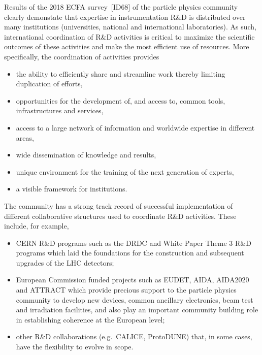 Results of the 2018 ECFA survey~[ID68] of the particle physics community clearly demonstate that expertise in instrumentation R\&D is distributed over many institutions (universities, national and international laboratories).  As such, international coordination of R\&D activities is critical to maximize the scientific outcomes of these activities and make the most efficient use of resources. More specifically, the coordination of activities provides
\begin{itemize}
\item the ability to efficiently share and streamline work thereby limiting duplication of efforts,
\item opportunities for the development of, and access to, common tools, infrastructures and services,
\item access to a large network of information and worldwide expertise in different areas,
\item wide dissemination of knowledge and results,
\item unique environment for the training of the next generation of experts,
\item a visible framework for institutions.
\end{itemize}

The community has a strong track record of successful implementation of different collaborative structures used to coordinate R\&D activities.  These include, for example,
\begin{itemize}
\item CERN R\&D programs such as the DRDC and White Paper Theme 3 R\&D programs which laid the foundations for the construction and subsequent upgrades of the LHC detectors;
\item European Commission funded projects such as EUDET, AIDA, AIDA2020 and ATTRACT which provide precious support to the particle physics community to develop new devices, common ancillary electronics, beam test and irradiation facilities, and also play an important community building role in establishing coherence at the European level;
\item other R\&D collaborations (e.g.\ CALICE, ProtoDUNE) that, in some cases, have the flexibility to evolve in scope.
\end{itemize}

